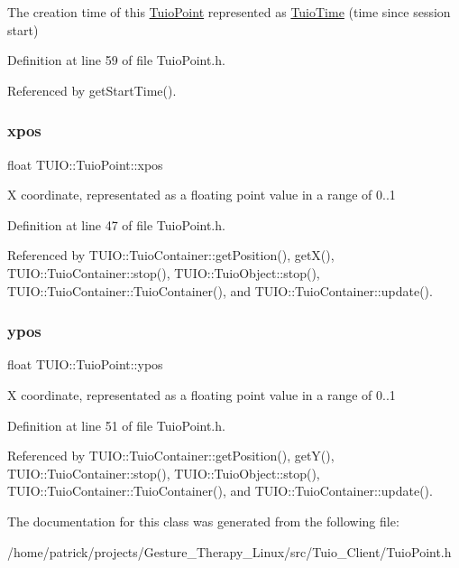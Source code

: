 The creation time of this \hyperlink{class_t_u_i_o_1_1_tuio_point}{Tuio\+Point} represented as \hyperlink{class_t_u_i_o_1_1_tuio_time}{Tuio\+Time} (time since session start) 

Definition at line 59 of file Tuio\+Point.\+h.



Referenced by get\+Start\+Time().

\mbox{\label{class_t_u_i_o_1_1_tuio_point_a0021f8dfddd05f2a17e713a94f5457e6}} 
\subsubsection{\texorpdfstring{xpos}{xpos}}
{\footnotesize\ttfamily float T\+U\+I\+O\+::\+Tuio\+Point\+::xpos\hspace{0.3cm}{\ttfamily [protected]}}

X coordinate, representated as a floating point value in a range of 0..1 

Definition at line 47 of file Tuio\+Point.\+h.



Referenced by T\+U\+I\+O\+::\+Tuio\+Container\+::get\+Position(), get\+X(), T\+U\+I\+O\+::\+Tuio\+Container\+::stop(), T\+U\+I\+O\+::\+Tuio\+Object\+::stop(), T\+U\+I\+O\+::\+Tuio\+Container\+::\+Tuio\+Container(), and T\+U\+I\+O\+::\+Tuio\+Container\+::update().

\mbox{\label{class_t_u_i_o_1_1_tuio_point_a89a038775a681166168735dbc95c7779}} 
\subsubsection{\texorpdfstring{ypos}{ypos}}
{\footnotesize\ttfamily float T\+U\+I\+O\+::\+Tuio\+Point\+::ypos\hspace{0.3cm}{\ttfamily [protected]}}

X coordinate, representated as a floating point value in a range of 0..1 

Definition at line 51 of file Tuio\+Point.\+h.



Referenced by T\+U\+I\+O\+::\+Tuio\+Container\+::get\+Position(), get\+Y(), T\+U\+I\+O\+::\+Tuio\+Container\+::stop(), T\+U\+I\+O\+::\+Tuio\+Object\+::stop(), T\+U\+I\+O\+::\+Tuio\+Container\+::\+Tuio\+Container(), and T\+U\+I\+O\+::\+Tuio\+Container\+::update().



The documentation for this class was generated from the following file\+:\begin{DoxyCompactItemize}
\item 
/home/patrick/projects/\+Gesture\+\_\+\+Therapy\+\_\+\+Linux/src/\+Tuio\+\_\+\+Client/Tuio\+Point.\+h\end{DoxyCompactItemize}
